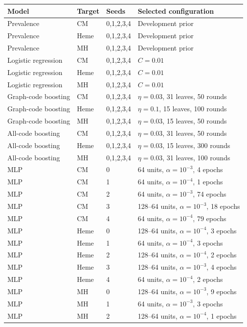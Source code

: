 \begin{tabular}{llll}
\hline
Model & Target & Seeds & Selected configuration \\
\hline
Prevalence & CM & 0,1,2,3,4 & Development prior \\
Prevalence & Heme & 0,1,2,3,4 & Development prior \\
Prevalence & MH & 0,1,2,3,4 & Development prior \\
Logistic regression & CM & 0,1,2,3,4 & $C=0.01$ \\
Logistic regression & Heme & 0,1,2,3,4 & $C=0.01$ \\
Logistic regression & MH & 0,1,2,3,4 & $C=0.01$ \\
Graph-code boosting & CM & 0,1,2,3,4 & $\eta=0.03$, 31 leaves, 50 rounds \\
Graph-code boosting & Heme & 0,1,2,3,4 & $\eta=0.1$, 15 leaves, 100 rounds \\
Graph-code boosting & MH & 0,1,2,3,4 & $\eta=0.03$, 15 leaves, 50 rounds \\
All-code boosting & CM & 0,1,2,3,4 & $\eta=0.03$, 31 leaves, 50 rounds \\
All-code boosting & Heme & 0,1,2,3,4 & $\eta=0.03$, 15 leaves, 300 rounds \\
All-code boosting & MH & 0,1,2,3,4 & $\eta=0.03$, 31 leaves, 100 rounds \\
MLP & CM & 0 & 64 units, $\alpha=10^{-3}$, 4 epochs \\
MLP & CM & 1 & 64 units, $\alpha=10^{-4}$, 1 epochs \\
MLP & CM & 2 & 64 units, $\alpha=10^{-3}$, 74 epochs \\
MLP & CM & 3 & 128--64 units, $\alpha=10^{-3}$, 18 epochs \\
MLP & CM & 4 & 64 units, $\alpha=10^{-4}$, 79 epochs \\
MLP & Heme & 0 & 128--64 units, $\alpha=10^{-4}$, 3 epochs \\
MLP & Heme & 1 & 64 units, $\alpha=10^{-4}$, 3 epochs \\
MLP & Heme & 2 & 128--64 units, $\alpha=10^{-4}$, 2 epochs \\
MLP & Heme & 3 & 128--64 units, $\alpha=10^{-3}$, 4 epochs \\
MLP & Heme & 4 & 64 units, $\alpha=10^{-4}$, 2 epochs \\
MLP & MH & 0 & 128--64 units, $\alpha=10^{-3}$, 9 epochs \\
MLP & MH & 1 & 64 units, $\alpha=10^{-3}$, 3 epochs \\
MLP & MH & 2 & 128--64 units, $\alpha=10^{-4}$, 1 epochs \\

\end{tabular}

